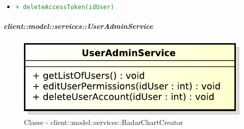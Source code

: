 \begin{itemize}
\begin{itemize}
\begin{description}
					\end{description}
					\item \textcolor{forestgreen}{\texttt{+ deleteAccessToken(idUser)}}
					
				\end{itemize}
			\end{itemize}

		\subparagraph{client::model::services::UserAdminService} %
		\label{subp:client_model_services_useradminservice}
		\begin{figure}[htbp]
				\centering
				\centerline{\includegraphics[scale=0.7]{./images/client/classes/model/user_admin_service.pdf}}
				\caption{Classe - client::model::services::RadarChartCreator}
			\end{figure}
